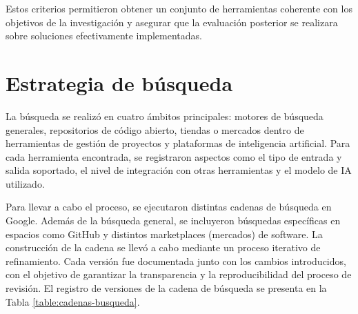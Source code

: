 Estos criterios permitieron obtener un conjunto de herramientas coherente con los objetivos de la investigación y asegurar que la evaluación posterior se realizara sobre soluciones efectivamente implementadas.

\section{Estrategia de búsqueda}
La búsqueda se realizó en cuatro ámbitos principales: motores de búsqueda generales, repositorios de código abierto, tiendas o mercados dentro de herramientas de gestión de proyectos y plataformas de inteligencia artificial. Para cada herramienta encontrada, se registraron aspectos como el tipo de entrada y salida soportado, el nivel de integración con otras herramientas y el modelo de IA utilizado. %

Para llevar a cabo el proceso, se ejecutaron distintas cadenas de búsqueda en Google. Además de la búsqueda general, se incluyeron búsquedas específicas en espacios como GitHub y distintos marketplaces (mercados) de software.
La construcción de la cadena se llevó a cabo mediante un proceso iterativo de refinamiento. Cada versión fue documentada junto con los cambios introducidos, con el objetivo de garantizar la transparencia y la reproducibilidad del proceso de revisión.
El registro de versiones de la cadena de búsqueda se presenta en la Tabla \ref{table:cadenas-busqueda}.

